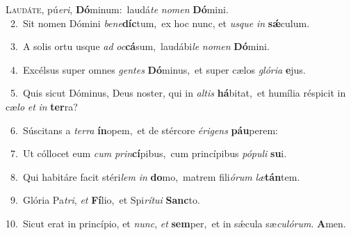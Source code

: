 \lettrine{\initial\textcolor{\initialcolor}{L}}{audáte,} pú\-\textit{e}\-\textit{ri}, \textbf{Dó}\-minum:~\star laudá\textit{te} \textit{no}\-\textit{men} \textbf{Dó}\-mini.\\
{\numbfont\textcolor{\numbcolor}{~2.}}~Sit nomen Dómini \textit{be}\-\textit{ne}\textbf{díc}tum,~\star ex hoc nunc, et \textit{us}\-\textit{que} \textit{in} \textbf{sǽ}\-culum.\par
{\numbfont\textcolor{\numbcolor}{~3.}}~A solis ortu usque \textit{ad} \textit{oc}\-\textbf{cá}sum,~\star laudábi\textit{le} \textit{no}\-\textit{men} \textbf{Dó}\-mini.\par
{\numbfont\textcolor{\numbcolor}{~4.}}~Excélsus super omnes \textit{gen}\-\textit{tes} \textbf{Dó}\-minus,~\star et super cælos \textit{gló}\-\textit{ri}\textit{a} \textbf{e}\-jus.\par
{\numbfont\textcolor{\numbcolor}{~5.}}~Quis sicut Dóminus, Deus noster, qui in \textit{al}\-\textit{tis} \textbf{há}\-bitat,~\star et humília réspicit in cæ\textit{lo} \textit{et} \textit{in} \textbf{ter}\-ra?\par
{\numbfont\textcolor{\numbcolor}{~6.}}~Súscitans a \textit{ter}\-\textit{ra} \textbf{ín}\-opem,~\star et de stércore \textit{é}\-\textit{ri}\textit{gens} \textbf{páu}\-perem:\par
{\numbfont\textcolor{\numbcolor}{~7.}}~Ut cóllocet eum \textit{cum} \textit{prin}\-\textbf{cí}pibus,~\star cum princípibus \textit{pó}\-\textit{pu}\textit{li} \textbf{su}\-i.\par
{\numbfont\textcolor{\numbcolor}{~8.}}~Qui habitáre facit stéri\textit{lem} \textit{in} \textbf{do}\-mo,~\star matrem fili\-\textit{ó}\-\textit{rum} \textit{læ}\-\textbf{tán}tem.\par
{\numbfont\textcolor{\numbcolor}{~9.}}~Glória Pa\-\textit{tri}\-, \textit{et} \textbf{Fí}\-lio,~\star et Spi\-\textit{rí}\-\textit{tu}\textit{i} \textbf{Sanc}\-to.\par
{\numbfont\textcolor{\numbcolor}{10.}}~Sicut erat in princípio, et \textit{nunc}\-, \textit{et} \textbf{sem}\-per,~\star et in sǽcula sæ\-\textit{cu}\-\textit{ló}\textit{rum}. \textbf{A}\-men.\par
